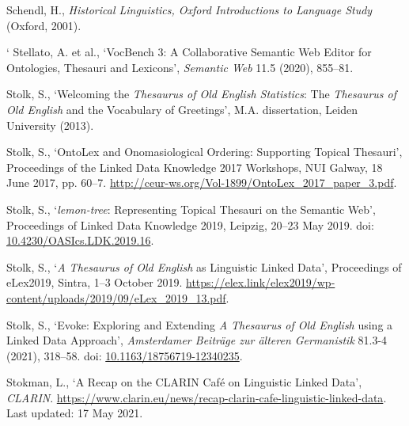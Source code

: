 \begin{list}{}
\item %
Schendl, H., \textit{Historical Linguistics, Oxford Introductions to Language Study} (Oxford, 2001). 



\item`%
Stellato, A. et al., `VocBench 3: A Collaborative Semantic Web Editor for Ontologies, Thesauri and Lexicons', \textit{Semantic Web} 11.5 (2020), 855–81.

\item %
Stolk, S., `Welcoming the \textit{Thesaurus of Old English Statistics}: The \textit{Thesaurus of Old English} and the Vocabulary of Greetings', M.A. dissertation, Leiden University (2013). 

\item %
Stolk, S., `OntoLex and Onomasiological Ordering: Supporting Topical Thesauri', Proceedings of the Linked Data Knowledge 2017 Workshops, NUI Galway, 18 June 2017, pp. 60–7. \url{http://ceur-ws.org/Vol-1899/OntoLex_2017_paper_3.pdf}.

\item %
Stolk, S., `\textit{lemon-tree}: Representing Topical Thesauri on the Semantic Web', Proceedings of Linked Data Knowledge 2019, Leipzig, 20–23 May 2019. doi: \href{https://doi.org/10.4230/OASIcs.LDK.2019.16}{\url{10.4230/OASIcs.LDK.2019.16}}.

\item %
Stolk, S., `\textit{A Thesaurus of Old English} as Linguistic Linked Data', Proceedings of eLex2019, Sintra, 1–3 October 2019. \url{https://elex.link/elex2019/wp-content/uploads/2019/09/eLex_2019_13.pdf}.

\item %
Stolk, S., `Evoke: Exploring and Extending \textit{A Thesaurus of Old English} using a Linked Data Approach', \textit{Amsterdamer Beiträge zur älteren Germanistik} 81.3-4 (2021), 318–58. doi: \href{https://doi.org/10.1163/18756719-12340235}{\url{10.1163/18756719-12340235}}.

\item %
Stokman, L., `A Recap on the CLARIN Café on Linguistic Linked Data', \textit{CLARIN}. \url{https://www.clarin.eu/news/recap-clarin-cafe-linguistic-linked-data}. Last updated: 17 May 2021.


\end{list}
